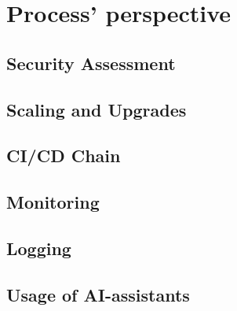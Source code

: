 \section{Process' perspective}
\subsection{Security Assessment}


\subsection{Scaling and Upgrades}


\subsection{CI/CD Chain}\label{cicd}


\subsection{Monitoring}


\subsection{Logging}


\subsection{Usage of AI-assistants}
